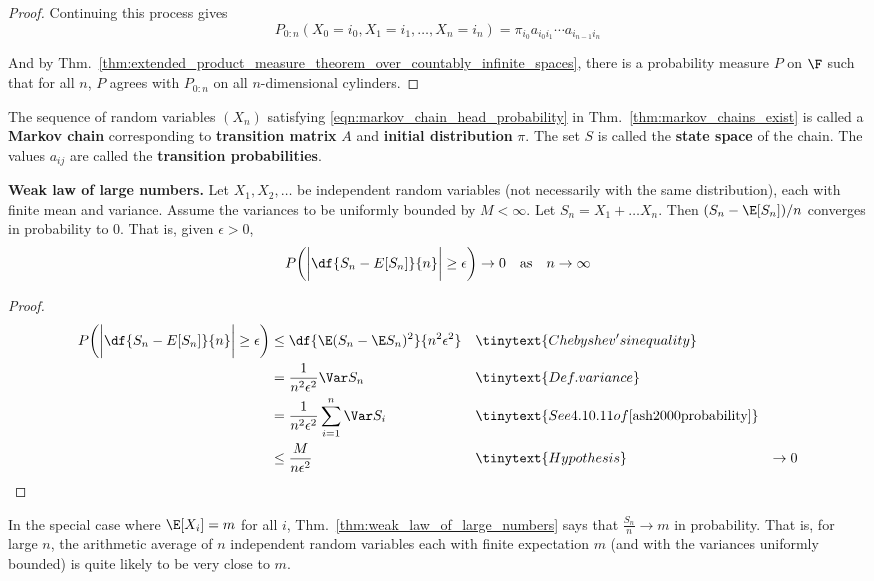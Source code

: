 \documentclass{article} %
\begin{document}
\begin{proof}
Continuing this process gives
\[P_{0:n}(X_0=i_0, X_1=i_1, \hdots, X_n=i_n) = \pi_{i_0} a_{i_0i_1} \cdots a_{i_{n-1}i_n}\]

And by Thm.~\ref{thm:extended_product_measure_theorem_over_countably_infinite_spaces}, there is a probability measure $P$ on $\F$ such that for all $n$, $P$ agrees with $P_{0:n}$ on all $n$-dimensional cylinders.
\end{proof}

\begin{remark}
The sequence of random variables $(X_n)$ satisfying \eqref{eqn:markov_chain_head_probability} in Thm.~\ref{thm:markov_chains_exist} is called a \textbf{Markov chain} corresponding to \textbf{transition matrix} $A$ and \textbf{initial distribution} $\pi$. The set $S$ is called the \textbf{state space} of the chain.  The values $a_{ij}$ are called the \textbf{transition probabilities}.
\end{remark}

\begin{theorem}\textbf{Weak law of large numbers.} Let $X_1, X_2, \hdots$ be independent random variables (not necessarily with the same distribution), each with finite mean and variance. Assume the variances to be uniformly bounded by $M < \infty$.  Let $S_n = X_1 + \hdots X_n$. Then $(S_n - \E[S_n])/n$ converges in probability to 0. That is, given $\epsilon > 0$,
\[  P \bigg(\bigg|\df{S_n - E[S_n]}{n} \bigg|\geq \epsilon \bigg) \to 0 \quad \text{as} \quad n \to \infty \]
\label{thm:weak_law_of_large_numbers}
\end{theorem}

\begin{proof}
\begin{align*}
P \bigg(\bigg|\df{S_n - E[S_n]}{n} \bigg|\geq \epsilon \bigg) &\leq  \df{\E(S_n - \E S_n)^2}{n^2 \epsilon^2} && \tinytext{Chebyshev's inequality}	\\
&= \frac{1}{n^2 \epsilon^2} \Var S_n && \tinytext{Def. variance} \\
&= \frac{1}{n^2 \epsilon^2} \sum_{i=1}^n \Var S_i && \tinytext{See 4.10.11 of \cite{ash2000probability}} \\
& \leq \frac{M}{n \epsilon^2}&& \tinytext{Hypothesis}
& \to 0
\end{align*}

\end{proof}

\begin{remark}
In the special case where $\E[X_i]=m$ for all $i$, Thm.~\ref{thm:weak_law_of_large_numbers} says that $\frac{S_n}{n} \to m$ in probability.  That is, for large $n$, the arithmetic average of $n$ independent random variables each with finite expectation $m$ (and with the variances uniformly bounded) is quite likely to be very close to $m$.
\end{remark}
\end{document}
